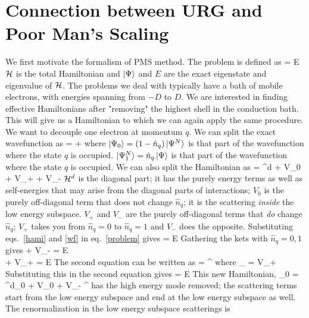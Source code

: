 \documentclass[14pt]{extarticle}
\numberwithin{equation}{section}
\begin{document}
\section{Connection between URG and Poor Man's Scaling}
We first motivate the formalism of PMS method. The problem is defined as
\beq[problem]
\ham\ket{\Psi} = E\ket{\Psi}
\eeq
\(\mathcal{H}\) is the total Hamiltonian and \(\ket{\Psi}\) and \(E\) are the exact eigenstate and eigenvalue of \(\mathcal{H}\). The problems we deal with typically have a bath of mobile electrons, with energies spanning from \(-D\) to \(D\). We are interested in finding effective Hamiltonians after "removing" the highest shell in the conduction bath. This will give us a Hamiltonian to which we can again apply the same procedure.
\pb We want to decouple one electron at momentum \(q\). We can split the exact wavefunction as
\beq[wf]
\ket{\Psi} =  + 
\eeq
where \(\ket{\Psi_0} = \left({1 - \hat n_{q}}\right)\ket{\Psi^N}\) is that part of the wavefunction where the state \(q\) is occupied. \(\ket{\Psi^N_1} = \hat n_q \ket{\Psi}\) is that part of the wavefunction where the state \(q\) is occupied. We can also split the Hamiltonian as
\beq[hami]
\ham = \ham^d + V_0 + V_+ + V_-
\eeq
\(\mathcal{H}^d\) is the diagonal part; it has the purely energy terms as well as self-energies that may arise from the diagonal parts of interactions; \(V_0\) is the purely off-diagonal term that does not change \(\hat n_q\); it is the scattering \textit{inside} the low energy subspace. \(V_+\) and \(V_-\) are the purely off-diagonal terms that \textit{do} change \(\hat n_q\); \(V_+\) takes you from \(\hat n_q = 0\) to \(\hat n_q = 1\) and \(V_-\) does the opposite.
\pb Substituting eqs.~\ref{hami} and \ref{wf} in eq.~\ref{problem} gives
\beq
{} = E
\eeq
Gathering the kets with \(\hat n_q = 0,1\) gives
\beq
{} + V_-  = E\\
 + V_+ = E
\eeq
The second equation can be written as
\beq
{} = \eta^\dagger {}
\eeq
where
\beq
\rr{\eta^\dagger}_ = V_+
\eeq
Substituting this in the second equation gives
\beq[reneq]
 = E
\eeq
This new Hamiltonian,
\beq
\tilde \ham_0 = \ham^d_0 + V_0 + V_- \eta^\dagger
\eeq
has the high energy mode removed; the scattering terms start from the low energy subspace and end at the low energy subspace as well. The renormalization in the low energy subspace scatterings  is
\end{document}

